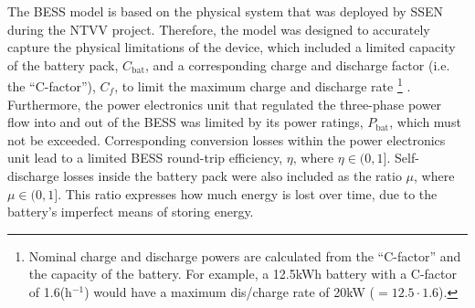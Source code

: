 \nomenclature[J]{$\mu$}{Self-discharge losses of battery, where $\mu \in (0, 1]$ (Chapter \ref{ch2})}
\nomenclature[J]{$\eta$}{Round-trip efficiency of power electronics, where $\eta \in (0, 1]$ (Chapter \ref{ch2})}

The BESS model is based on the physical system that was deployed by SSEN during the NTVV project.
Therefore, the model was designed to accurately capture the physical limitations of the device, which included a limited capacity of the battery pack, $C_\text{bat}$, and a corresponding charge and discharge factor (i.e. the ``C-factor''), $C_{f}$, to limit the maximum charge and discharge rate
\footnote{Nominal charge and discharge powers are calculated from the ``C-factor'' and the capacity of the battery. For example, a 12.5kWh battery with a C-factor of 1.6(h$^{-1}$) would have a maximum dis/charge rate of 20kW ($=12.5 \cdot 1.6$).}
.
Furthermore, the power electronics unit that regulated the three-phase power flow into and out of the BESS was limited by its power ratings, $P_\text{bat}$, which must not be exceeded.
Corresponding conversion losses within the power electronics unit lead to a limited BESS round-trip efficiency, $\eta$, where $\eta \in (0, 1]$.
Self-discharge losses inside the battery pack were also included as the ratio $\mu$, where $\mu \in (0, 1]$.
This ratio expresses how much energy is lost over time, due to the battery's imperfect means of storing energy.

